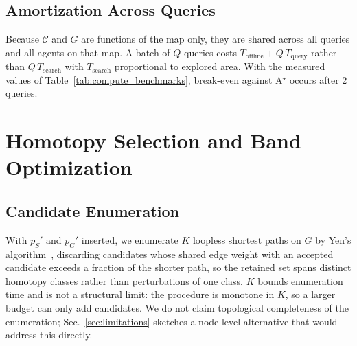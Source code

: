 \documentclass[conference]{IEEEtran}
\begin{document}
\subsection{Amortization Across Queries}
Because $\mathcal{C}$ and $G$ are functions of the map only, they are shared across all queries and all agents on that map. A batch of $Q$ queries costs $T_{\mathrm{offline}} + Q\,T_{\mathrm{query}}$ rather than $Q\,T_{\mathrm{search}}$ with $T_{\mathrm{search}}$ proportional to explored area. With the measured values of Table~\ref{tab:compute_benchmarks}, break-even against A$^\star$ occurs after $2$ queries.
\section{Homotopy Selection and Band Optimization}
\label{sec:opt}
\subsection{Candidate Enumeration}
With $p_S'$ and $p_G'$ inserted, we enumerate $K$ loopless shortest paths on $G$ by Yen's algorithm~\cite{yen1971}, discarding candidates whose shared edge weight with an accepted candidate exceeds a fraction of the shorter path, so the retained set spans distinct homotopy classes rather than perturbations of one class. $K$ bounds enumeration time and is not a structural limit: the procedure is monotone in $K$, so a larger budget can only add candidates. We do not claim topological completeness of the enumeration; Sec.~\ref{sec:limitations} sketches a node-level alternative that would address this directly.
\end{document}
